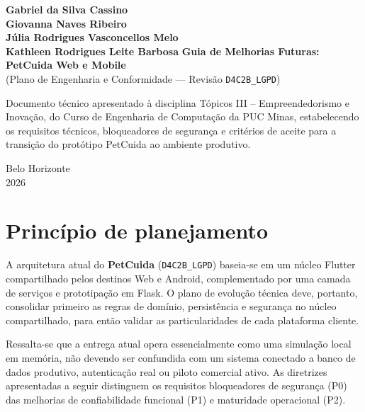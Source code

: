 \documentclass[12pt,a4paper]{article}
\begin{document}
\begin{titlepage}
\begin{center}
{\large\textbf{Gabriel da Silva Cassino}}\\
{\large\textbf{Giovanna Naves Ribeiro}}\\
{\large\textbf{Júlia Rodrigues Vasconcellos Melo}}\\
{\large\textbf{Kathleen Rodrigues Leite Barbosa}}
\vfill
{\Large\textbf{Guia de Melhorias Futuras: PetCuida Web e Mobile}}\\
{\large (Plano de Engenharia e Conformidade --- Revisão \texttt{D4C2B\_LGPD})}
\vfill
\end{center}
\begin{flushright}
\begin{minipage}{8cm}
\small Documento técnico apresentado à disciplina Tópicos III -- Empreendedorismo e Inovação, do Curso de Engenharia de Computação da PUC Minas, estabelecendo os requisitos técnicos, bloqueadores de segurança e critérios de aceite para a transição do protótipo PetCuida ao ambiente produtivo.
\end{minipage}
\end{flushright}
\vfill
\begin{center}Belo Horizonte\\2026\end{center}
\end{titlepage}

\tableofcontents
\newpage

\section{Princípio de planejamento}
A arquitetura atual do \textbf{PetCuida} (\texttt{D4C2B\_LGPD}) baseia-se em um núcleo Flutter compartilhado pelos destinos Web e Android, complementado por uma camada de serviços e prototipação em Flask. O plano de evolução técnica deve, portanto, consolidar primeiro as regras de domínio, persistência e segurança no núcleo compartilhado, para então validar as particularidades de cada plataforma cliente.

Ressalta-se que a entrega atual opera essencialmente como uma simulação local em memória, não devendo ser confundida com um sistema conectado a banco de dados produtivo, autenticação real ou piloto comercial ativo. As diretrizes apresentadas a seguir distinguem os requisitos bloqueadores de segurança (P0) das melhorias de confiabilidade funcional (P1) e maturidade operacional (P2).
\end{document}
